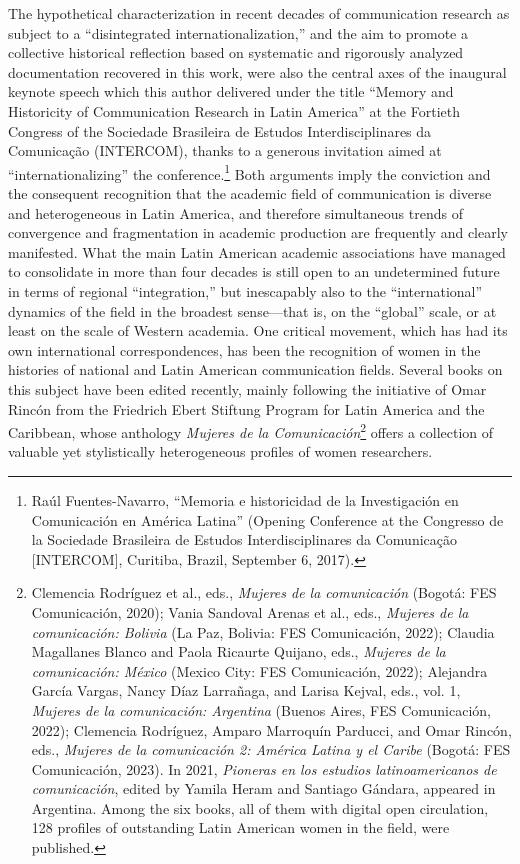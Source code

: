 \documentclass{tufte-handout}
\begin{document}
The hypothetical characterization in recent decades of communication
research as subject to a ``disintegrated internationalization,'' and the
aim to promote a collective historical reflection based on systematic
and rigorously analyzed documentation recovered in this work, were also
the central axes of the inaugural keynote speech which this author
delivered under the title ``Memory and Historicity of Communication
Research in Latin America'' at the Fortieth Congress of the Sociedade
Brasileira de Estudos Interdisciplinares da Comunicação (INTERCOM),
thanks to a generous invitation aimed at ``internationalizing'' the
conference.\footnote{Raúl Fuentes-Navarro, ``Memoria e historicidad de
  la Investigación en Comunicación en América Latina'' (Opening Conference
  at the Congresso de la Sociedade Brasileira de Estudos
  Interdisciplinares da Comunicação {[}INTERCOM{]}, Curitiba, Brazil,
  September 6, 2017).} Both arguments imply the conviction and the
consequent recognition that the academic field of communication is
diverse and heterogeneous in Latin America, and therefore simultaneous
trends of convergence and fragmentation in academic production are
frequently and clearly manifested. What the main Latin American academic
associations have managed to consolidate in more than four decades is
still open to an undetermined future in terms of regional
``integration,'' but inescapably also to the ``international'' dynamics
of the field in the broadest sense---that is, on the ``global'' scale,
or at least on the scale of Western academia. One critical movement,
which has had its own international correspondences, has been the
recognition of women in the histories of national and Latin American
communication fields. Several books on this subject have been edited
recently, mainly following the initiative of Omar Rincón from the
Friedrich Ebert Stiftung Program for Latin America and the Caribbean,
whose anthology \emph{Mujeres de la Comunicación}\footnote{Clemencia
  Rodríguez et al., eds., \emph{Mujeres de la comunicación} (Bogotá: FES
  Comunicación, 2020); Vania Sandoval Arenas et al., eds., \emph{Mujeres
  de la comunicación: Bolivia} (La Paz, Bolivia: FES Comunicación,
  2022); Claudia Magallanes Blanco and Paola Ricaurte Quijano, eds.,
  \emph{Mujeres de la comunicación: México} (Mexico City: FES
  Comunicación, 2022); Alejandra García Vargas, Nancy Díaz Larrañaga,
  and Larisa Kejval, eds., vol. 1, \emph{Mujeres de la comunicación:
  Argentina} (Buenos Aires, FES Comunicación, 2022); Clemencia
  Rodríguez, Amparo Marroquín Parducci, and Omar Rincón, eds.,
  \emph{Mujeres de la comunicación 2: América Latina y el Caribe}
  (Bogotá: FES Comunicación, 2023). In 2021, \emph{Pioneras en los
  estudios latinoamericanos de comunicación}, edited by Yamila Heram and
  Santiago Gándara, appeared in Argentina. Among the six books, all of
  them with digital open circulation, 128 profiles of outstanding Latin
  American women in the field, were published.} offers a collection of
valuable yet stylistically heterogeneous profiles of women researchers.
\end{document}

